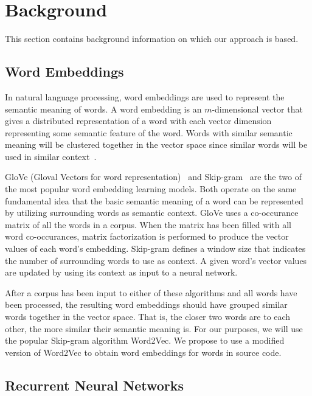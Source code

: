 \section{Background}

This section contains background information on which our approach is based.

\subsection{Word Embeddings}

In natural language processing, word embeddings are used to represent the semantic meaning of words. A word embedding is an $m$-dimensional vector that gives a distributed representation of a word with each vector dimension representing some semantic feature of the word. Words with similar semantic meaning will be clustered together in the vector space since similar words will be used in similar context~\cite{mikolov2013distributed}.

GloVe (Gloval Vectors for word representation)~\cite{pennington2014glove} and Skip-gram~\cite{mikolov2013efficient} are the two of the most popular word embedding learning models. Both operate on the same fundamental idea that the basic semantic meaning of a word can be represented by utilizing surrounding words as semantic context. GloVe uses a co-occurance matrix of all the words in a corpus. When the matrix has been filled with all word co-occurances, matrix factorization is performed to produce the vector values of each word's embedding. Skip-gram defines a window size that indicates the number of surrounding words to use as context. A given word's vector values are updated by using its context as input to a neural network.

After a corpus has been input to either of these algorithms and all words have been processed, the resulting word embeddings should have grouped similar words together in the vector space. That is, the closer two words are to each other, the more similar their semantic meaning is. For our purposes, we will use the popular Skip-gram algorithm Word2Vec. We propose to use a modified version of Word2Vec to obtain word embeddings for words in source code. 
 
\subsection{Recurrent Neural Networks}

